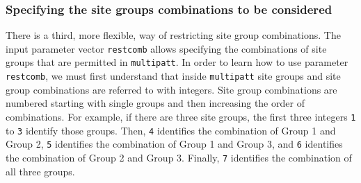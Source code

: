 \documentclass[11pt,a4paper]{article}
\begin{document}
\subsubsection{Specifying the site groups combinations to be considered}
There is a third, more flexible, way of restricting site group combinations. The input parameter vector \texttt{restcomb} allows specifying the combinations of site groups that are permitted in \texttt{multipatt}. In order to learn how to use parameter \texttt{restcomb}, we must first understand that inside \texttt{multipatt} site groups and site group combinations are referred to with integers. Site group combinations are numbered starting with single groups and then increasing the order of combinations. For example, if there are three site groups, the first three integers \texttt{1} to \texttt{3} identify those groups. Then, \texttt{4} identifies the combination of Group 1 and Group 2, \texttt{5} identifies the combination of Group 1 and Group 3, and \texttt{6} identifies the combination of Group 2 and Group 3. Finally, \texttt{7} identifies the combination of all three groups. 
\end{document}
